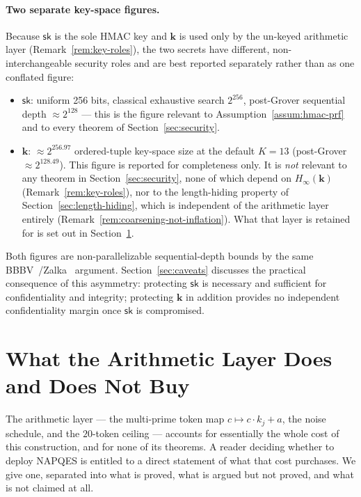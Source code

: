 \documentclass[11pt,a4paper]{article}
\begin{document}
\paragraph{Two separate key-space figures.}
Because $\mathsf{sk}$ is the sole HMAC key and $\mathbf{k}$ is used only by
the un-keyed arithmetic layer (Remark~\ref{rem:key-roles}), the two secrets
have different, non-interchangeable security roles and are best reported
separately rather than as one conflated figure:
\begin{itemize}
  \item $\mathsf{sk}$: uniform 256 bits, classical exhaustive search
        $2^{256}$, post-Grover sequential depth $\approx2^{128}$ — this is
        the figure relevant to Assumption~\ref{assum:hmac-prf} and to every
        theorem of Section~\ref{sec:security}.
  \item $\mathbf{k}$: $\approx2^{256.97}$ ordered-tuple key-space size at the
        default $K=13$ (post-Grover $\approx2^{128.49}$). This figure is
        reported for completeness only. It is \emph{not} relevant to any
        theorem in Section~\ref{sec:security}, none of which depend on
        $H_\infty(\mathbf{k})$ (Remark~\ref{rem:key-roles}), nor to the
        length-hiding property of Section~\ref{sec:length-hiding}, which is
        independent of the arithmetic layer entirely
        (Remark~\ref{rem:coarsening-not-inflation}). What that layer is
        retained for is set out in Section~\ref{sec:arith-layer-value}.
\end{itemize}
Both figures are non-parallelizable sequential-depth bounds by the same
BBBV~\cite{bbbv1997}/Zalka~\cite{zalka1999} argument. Section~\ref{sec:caveats}
discusses the practical consequence of this asymmetry: protecting
$\mathsf{sk}$ is necessary and sufficient for confidentiality and
integrity; protecting $\mathbf{k}$ in addition provides no independent
confidentiality margin once $\mathsf{sk}$ is compromised.

\section{What the Arithmetic Layer Does and Does Not Buy}
\label{sec:arith-layer-value}

The arithmetic layer — the multi-prime token map $c\mapsto c\cdot k_j+a$,
the noise schedule, and the $20$-token ceiling — accounts for essentially
the whole cost of this construction, and for none of its theorems. A reader
deciding whether to deploy NAPQES is entitled to a direct statement of what
that cost purchases. We give one, separated into what is proved, what is
argued but not proved, and what is not claimed at all.
\end{document}
